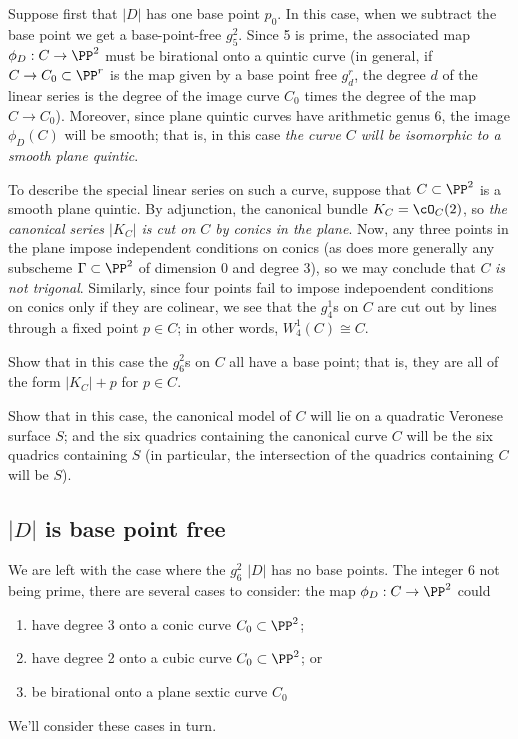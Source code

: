 Suppose first that $|D|$ has one base point $p_0$. In this case, when we subtract the base point we get a base-point-free $g^2_5$. Since 5 is prime, the associated map $\phi_D : C \to \PP^2$ must be birational onto a quintic curve (in general, if $C \to C_0 \subset \PP^r$ is the map given by a base point free $g^r_d$, the degree $d$ of the linear series is the degree of the image curve $C_0$ times the degree of the map $C \to C_0$). Moreover, since plane quintic curves have arithmetic genus 6, the image $\phi_D(C)$ will be smooth; that is, in this case \emph{the curve $C$ will be isomorphic to a smooth plane quintic}.

To describe the special linear series on such a curve, suppose that $C \subset \PP^2$ is a smooth plane quintic. By adjunction, the canonical bundle $K_C = \cO_C(2)$, so \emph{the canonical series $|K_C|$ is cut on $C$ by conics in the plane}. Now, any three points in the plane impose independent conditions on conics (as does more generally any subscheme $\Gamma \subset \PP^2$ of dimension 0 and degree 3), so we may conclude that $C$ \emph{is not trigonal}. Similarly, since four points fail to impose indepoendent conditions on conics only if they are colinear, we see that the $g^1_4$s on $C$ are cut out by lines through a fixed point $p \in C$; in other words, $W^1_4(C) \cong C$.

\begin{exercise}
Show that in this case the $g^2_6$s on $C$ all have a base point; that is, they are all of the form $|K_C| + p$ for $p \in C$.
\end{exercise} 


\begin{exercise}
Show that in this case, the canonical model of $C$ will lie on a quadratic Veronese surface $S$; and the six
quadrics containing the canonical curve $C$ will be the six quadrics containing $S$ (in particular, the intersection of the quadrics containing $C$ will be $S$).
\end{exercise} 

\subsection{$|D|$ is base point free}



We are left with the case where the $g^2_6$ $|D|$ has no base points. The integer 6 not being prime, there are several cases to consider: the map $\phi_D : C \to \PP^2$ could
\begin{enumerate}
\item have degree 3 onto a conic curve $C_0 \subset \PP^2$;
\item have degree 2 onto a cubic curve $C_0 \subset \PP^2$; or
\item be birational onto a plane sextic curve $C_0$
\end{enumerate}
We'll consider these cases in turn.

